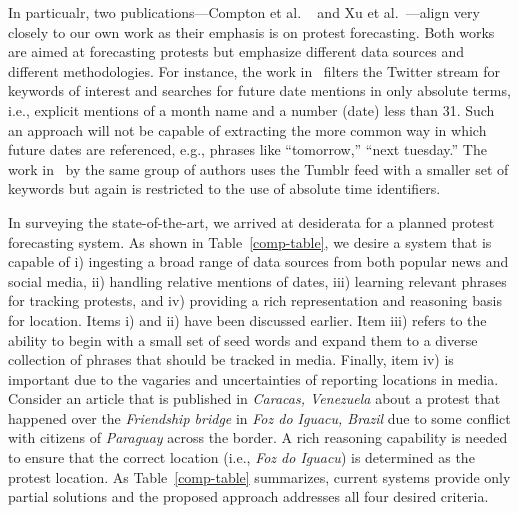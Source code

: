 In particualr, two publications---Compton et al. ~\cite{compton2013detecting} and Xu et al.~\cite{xu2014civil}---align very closely to our own work as their emphasis is on protest forecasting.
Both works are aimed at forecasting protests
but emphasize different data sources and different methodologies. For instance, the work in~\cite{compton2013detecting} filters the Twitter stream for
keywords of interest and searches for future date mentions in only absolute terms, i.e., explicit mentions of a month name and a number (date)
less than 31. 
Such an approach will not be capable of extracting the more
common way in which future dates are referenced, e.g., phrases like
``tomorrow,'' ``next tuesday.'' 
The work in~\cite{xu2014civil} by the same group of authors uses the Tumblr feed with a smaller set of keywords but
again is restricted to the use of absolute time identifiers.

In surveying the state-of-the-art, we arrived at desiderata for a planned protest forecasting system. As shown in Table~\ref{comp-table},
we desire a system that is capable of i) ingesting a broad range of data sources from both popular news and social media,
ii) handling relative mentions of dates, iii) learning relevant phrases for tracking protests, and iv) providing a rich representation
and reasoning basis for location. Items i) and ii) have been discussed earlier. Item iii) refers to the ability to begin with
a small set of seed words and expand them to a diverse collection of phrases that should be tracked in media. Finally,
item iv) is important due to the vagaries and uncertainties of reporting locations in media. Consider an article that is published
in {\it Caracas, Venezuela} about a protest that happened over the {\it Friendship bridge} in {\it Foz do Iguacu, Brazil} due to 
some conflict with citizens of {\it Paraguay}
across the border. A rich reasoning capability is needed to ensure that the correct location (i.e., {\it Foz do Iguacu}) is determined 
as the protest location. As Table~\ref{comp-table} summarizes, current systems provide only partial solutions and the proposed
approach addresses all four desired criteria.
